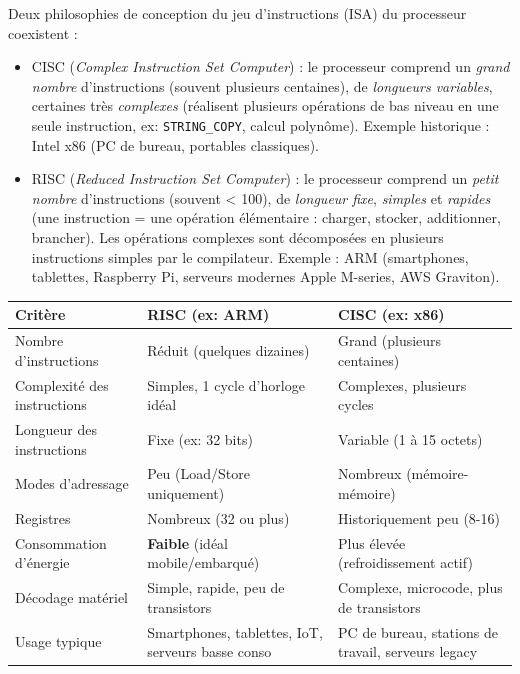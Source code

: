 \documentclass[11pt]{article}
\newcommand{\cle}[1]{{\popxbold\color{popdark}#1}}
\newcounter{popsec}
\newcounter{popsub}
\newcommand{\courssub}[1]{%
  \stepcounter{popsub}%
  \par\vspace{9pt}\noindent{\popxbold\fontsize{11.5}{13}\selectfont\color{popink}{\color{poporange}\thepopsec.\thepopsub}\hspace{6pt}#1}\par\nopagebreak\vspace{4pt}
}
\begin{document}
\courssub{Les architectures RISC et CISC}

\begin{definition}
Deux philosophies de conception du jeu d'instructions (ISA) du processeur coexistent :
\begin{itemize}
\item \cle{CISC} (\emph{Complex Instruction Set Computer}) : le processeur comprend un \emph{grand nombre} d'instructions (souvent plusieurs centaines), de \emph{longueurs variables}, certaines très \emph{complexes} (réalisent plusieurs opérations de bas niveau en une seule instruction, ex: \texttt{STRING\_COPY}, calcul polynôme). Exemple historique : Intel x86 (PC de bureau, portables classiques).
\item \cle{RISC} (\emph{Reduced Instruction Set Computer}) : le processeur comprend un \emph{petit nombre} d'instructions (souvent < 100), de \emph{longueur fixe}, \emph{simples} et \emph{rapides} (une instruction = une opération élémentaire : charger, stocker, additionner, brancher). Les opérations complexes sont décomposées en plusieurs instructions simples par le compilateur. Exemple : ARM (smartphones, tablettes, Raspberry Pi, serveurs modernes Apple M-series, AWS Graviton).
\end{itemize}
\end{definition}

\begin{propriete}
\begin{center}
\begin{tabularx}{\linewidth}{|l|X|X|}
\hline
\rowcolor{popblueL}
\textbf{Critère} & \textbf{RISC (ex: ARM)} & \textbf{CISC (ex: x86)} \\
\hline
Nombre d'instructions & Réduit (quelques dizaines) & Grand (plusieurs centaines) \\
\hline
Complexité des instructions & Simples, 1 cycle d'horloge idéal & Complexes, plusieurs cycles \\
\hline
Longueur des instructions & Fixe (ex: 32 bits) & Variable (1 à 15 octets) \\
\hline
Modes d'adressage & Peu (Load/Store uniquement) & Nombreux (mémoire-mémoire) \\
\hline
Registres & Nombreux (32 ou plus) & Historiquement peu (8-16) \\
\hline
Consommation d'énergie & \textbf{Faible} (idéal mobile/embarqué) & Plus élevée (refroidissement actif) \\
\hline
Décodage matériel & Simple, rapide, peu de transistors & Complexe, microcode, plus de transistors \\
\hline
Usage typique & Smartphones, tablettes, IoT, serveurs basse conso & PC de bureau, stations de travail, serveurs legacy \\
\hline
\end{tabularx}
\end{center}
\end{propriete}
\end{document}
